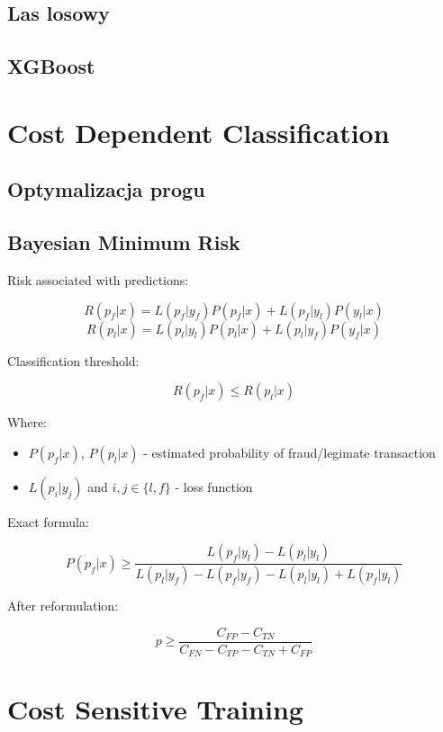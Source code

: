 \documentclass{book}
\begin{document}

\subsection{Las losowy}

\subsection{XGBoost}

\section{Cost Dependent Classification}
	
	\subsection{Optymalizacja progu}
	
	
	
	\subsection{Bayesian Minimum Risk}
	
	Risk associated with predictions:
	
	$$ R(p_f|x) = L(p_f|y_f)P(p_f|x) + L(p_f|y_l)P(y_l|x) $$
	$$ R(p_l|x) = L(p_l|y_l)P(p_l|x) + L(p_l|y_f)P(y_f|x) $$
	
	Classification threshold:
	
	$$ R(p_f|x) \leq R(p_l|x)$$
	
	Where:
	
	\begin{itemize}
		\item $P(p_f|x)$, $P(p_l|x)$ - estimated probability of fraud/legimate transaction
		\item $L(p_{i}|y_{j})$ and $i,j \in \{l,f\}$ - loss function
	\end{itemize}{}
	Exact formula:
	
	$$ P(p_f|x) \ge \frac{L(p_f|y_l) - L(p_l|y_l)}{L(p_l|y_f) - L(p_f|y_f) - L(p_l|y_l) + L(p_f|y_l)}$$
	
	After reformulation:
	
	$$ p \ge \frac{C_{FP} - C_{TN}}{C_{FN} - C_{TP} - C_{TN} + C_{FP}}$$

	\section{Cost Sensitive Training}
	
\end{document}
